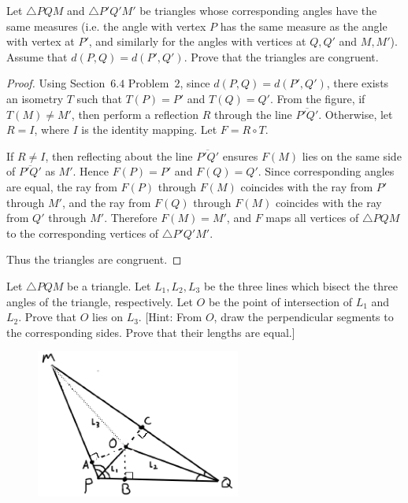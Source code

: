 \begin{tcolorbox}[title=Problem 11, breakable]
    Let $\triangle PQM$ and $\triangle P'Q'M'$ be triangles whose corresponding
        angles have the same measures (i.e. the angle with vertex $P$ has the same 
        measure as the angle with vertex at $P'$, and similarly for the angles with
        vertices at $Q, Q'$ and $M, M'$). Assume that $d(P, Q) = d(P', Q')$.
    Prove that the triangles are congruent.
\end{tcolorbox}

\begin{proof}
    Using Section~$6.4$ Problem~$2$, since $d(P,Q) = d(P',Q')$, 
    there exists an isometry $T$ such that $T(P) = P'$ and $T(Q) = Q'$.
    From the figure, if $T(M) \ne M'$, then perform a reflection $R$ through the line $\overline{P'Q'}$.
    Otherwise, let $R = I$, where $I$ is the identity mapping.
    Let $F = R \circ T$.

    If $R \ne I$, then reflecting about the line $\overline{P'Q'}$
    ensures $F(M)$ lies on the same side of $\overline{P'Q'}$ as $M'$.
    Hence $F(P) = P'$ and $F(Q) = Q'$.
    Since corresponding angles are equal, the ray from $F(P)$ through $F(M)$
    coincides with the ray from $P'$ through $M'$, and the ray from $F(Q)$ through $F(M)$
    coincides with the ray from $Q'$ through $M'$.
    Therefore $F(M) = M'$, and $F$ maps all vertices of $\triangle PQM$
    to the corresponding vertices of $\triangle P'Q'M'$.

    Thus the triangles are congruent.
\end{proof}

\begin{tcolorbox}[title=Problem 12, breakable]
    Let $\triangle PQM$ be a triangle. 
    Let $L_1, L_2, L_3$ be the three lines which bisect 
        the three angles of the triangle, respectively.
    Let $O$ be the point of intersection of $L_1$ and $L_2$.
    Prove that $O$ lies on $L_3$.
    [Hint: From $O$, draw the perpendicular segments to the corresponding sides. 
     Prove that their lengths are equal.]
\end{tcolorbox}

\begin{figure}[h]
    \centering
    \includegraphics[width=0.6\textwidth]{images/last.png}
\end{figure}

